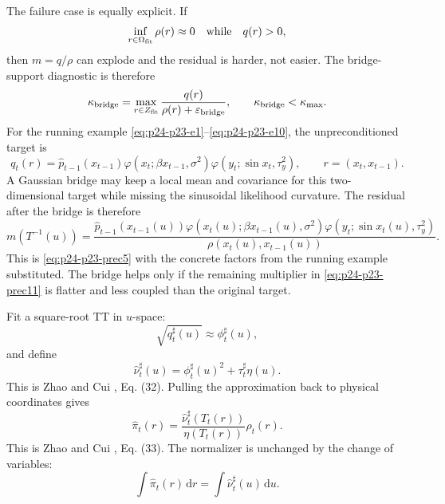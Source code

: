 \documentclass[11pt]{article}
\numberwithin{equation}{section}
\newcommand{\dd}{\,\mathrm d}
\begin{document}
The failure case is equally explicit.  If
\begin{equation}
    \inf_{r\in\Omega_{\rm fit}}\rho(r)\approx0
    \quad\text{while}\quad q(r)>0,
    \label{eq:p24-p23-prec8}
\end{equation}
then \(m=q/\rho\) can explode and the residual is harder, not easier.  The
bridge-support diagnostic is therefore
\begin{equation}
    \kappa_{\rm bridge}
    =
    \max_{r\in Z_{\rm fit}}\frac{q(r)}{\rho(r)+\varepsilon_{\rm bridge}},
    \qquad
    \kappa_{\rm bridge}<\kappa_{\max}.
    \label{eq:p24-p23-prec9}
\end{equation}
For the running example \eqref{eq:p24-p23-e1}--\eqref{eq:p24-p23-e10}, the unpreconditioned target is
\begin{equation}
    q_t(r)
    =
    \widehat p_{t-1}(x_{t-1})
    \varphi(x_t;\beta x_{t-1},\sigma^2)
    \varphi(y_t;\sin x_t,\tau_y^2),
    \qquad
    r=(x_t,x_{t-1}).
    \label{eq:p24-p23-prec10}
\end{equation}
A Gaussian bridge may keep a local mean and covariance for this
two-dimensional target while missing the sinusoidal likelihood curvature.  The
residual after the bridge is therefore
\begin{equation}
    m(T^{-1}(u))
    =
    \frac{
    \widehat p_{t-1}(x_{t-1}(u))
    \varphi(x_t(u);\beta x_{t-1}(u),\sigma^2)
    \varphi(y_t;\sin x_t(u),\tau_y^2)}
    {\rho(x_t(u),x_{t-1}(u))}.
    \label{eq:p24-p23-prec11}
\end{equation}
This is \eqref{eq:p24-p23-prec5} with the concrete factors from the running example
substituted.  The bridge helps only if the remaining multiplier in
\eqref{eq:p24-p23-prec11} is flatter and less coupled than the original target.

Fit a square-root TT in \(u\)-space:
\[
    \sqrt{q^\sharp_t(u)}\approx \phi^\sharp_t(u),
\]
and define
\begin{equation}
    \widehat\nu^\sharp_t(u)
    =
    \phi^\sharp_t(u)^2+\tau^\sharp_t\eta(u).
    \label{eq:p24-p3}
\end{equation}
This is Zhao and Cui \cite{zhao2024ttsequential}, Eq. (32).  Pulling the approximation back to physical
coordinates gives
\begin{equation}
    \widehat\pi_t(r)
    =
    \frac{\widehat\nu^\sharp_t(T_t(r))}
    {\eta(T_t(r))}
    \rho_t(r).
    \label{eq:p24-p4}
\end{equation}
This is Zhao and Cui \cite{zhao2024ttsequential}, Eq. (33).  The normalizer is unchanged by the change of
variables:
\begin{equation}
    \int \widehat\pi_t(r)\dd r
    =
    \int \widehat\nu^\sharp_t(u)\dd u.
    \label{eq:p24-p5}
\end{equation}
\end{document}
